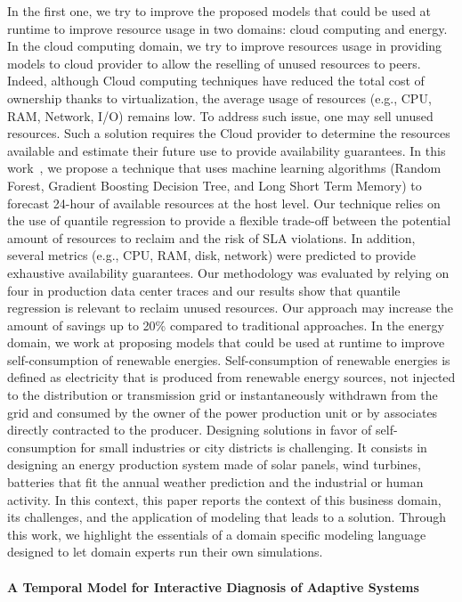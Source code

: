In the first one, we try to improve the proposed models that could be used at runtime to improve resource usage in two domains: cloud computing and energy. In the cloud computing domain, we try to improve resources usage in providing models to cloud provider to allow the reselling of unused resources to peers. Indeed, although Cloud computing techniques have reduced the total cost of ownership thanks to virtualization, the average usage of resources (e.g., CPU, RAM, Network, I/O) remains low. To address such issue, one may sell unused resources. Such a solution requires the Cloud provider to determine the resources available and estimate their future use to provide availability guarantees. In this work~\cite{},  we propose a technique that uses machine learning algorithms (Random Forest, Gradient Boosting Decision Tree, and Long Short Term Memory) to forecast 24-hour of available resources at the host level. Our technique relies on the use of quantile regression to provide a flexible trade-off between the potential amount of resources to reclaim and the risk of SLA violations. In addition, several metrics (e.g., CPU, RAM, disk, network) were predicted to provide exhaustive availability guarantees. Our methodology was evaluated by relying on four in production data center traces and our results show that quantile regression is relevant to reclaim unused resources. Our approach may increase the amount of savings up to 20\% compared to traditional approaches.
In the energy domain, we work at proposing models that could be used at runtime to improve self-consumption of renewable energies. Self-consumption of renewable energies is defined as electricity that is produced from renewable energy sources, not injected to the distribution or transmission grid or instantaneously withdrawn from the grid and consumed by the owner of the power production unit or by associates directly contracted to the producer. Designing solutions in favor of self-consumption for small industries or city districts is challenging. It consists in designing an energy production system made of solar panels, wind turbines, batteries that fit the annual weather prediction and the industrial or human activity. In this context, this paper reports the context of this business domain, its challenges, and the application of modeling that leads to a solution. Through this work, we highlight the essentials of a domain specific modeling language designed to let domain experts run their own simulations. 


\paragraph{A Temporal Model for Interactive Diagnosis of Adaptive Systems}




